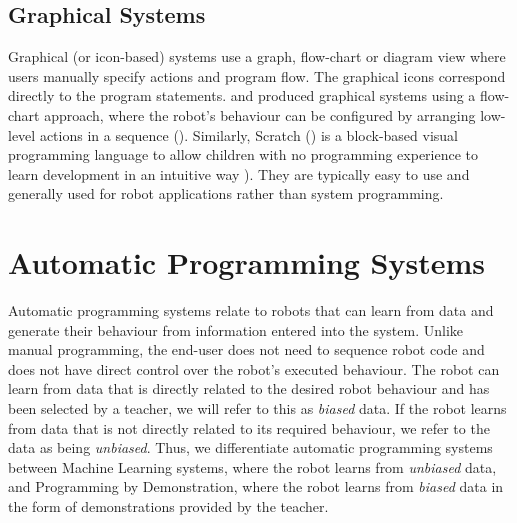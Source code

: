 \subsection{Graphical Systems}\label{sssec:Graphical systems}
Graphical (or icon-based) systems use a graph, flow-chart or diagram view where users manually specify actions and program flow.
The graphical icons correspond directly to the program statements.
\cite{lego2003} and \cite{bischoff2002morpha} produced graphical systems using a flow-chart approach, where the robot's behaviour can be configured by arranging low-level actions in a sequence ().
Similarly, Scratch (\cite{majed2014learn}) is a block-based visual programming language to allow children with no programming experience to learn development in an intuitive way ).
They are typically easy to use and generally used for robot applications rather than system programming. 

\section{Automatic Programming Systems}\label{subsec:Automatic Programming Systems}
Automatic programming systems relate to robots that can learn from data and generate their behaviour from information entered into the system.
Unlike manual programming, the end-user does not need to sequence robot code and does not have direct control over the robot's executed behaviour.
The robot can learn from data that is directly related to the desired robot behaviour and has been selected by a teacher, we will refer to this as \textit{biased} data.
If the robot learns from data that is not directly related to its required behaviour, we refer to the data as being \textit{unbiased}.
Thus, we differentiate automatic programming systems between Machine Learning systems, where the robot learns from \textit{unbiased} data, and Programming by Demonstration, where the robot learns from \textit{biased} data in the form of demonstrations provided by the teacher.

